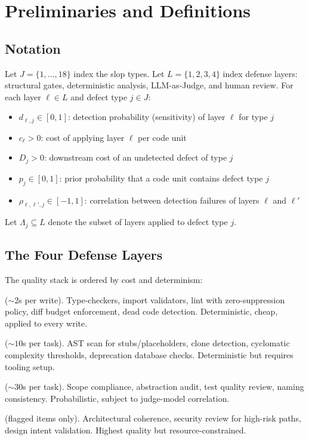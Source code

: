 \documentclass[11pt, a4paper]{article}
\theoremstyle{definition}
\theoremstyle{remark}
\begin{document}
\section{Preliminaries and Definitions}
\label{sec:prelim}

\subsection{Notation}

Let $J = \{1, \ldots, 18\}$ index the slop types. Let $L = \{1, 2, 3, 4\}$ index defense layers: structural gates, deterministic analysis, LLM-as-Judge, and human review. For each layer $\ell \in L$ and defect type $j \in J$:

\begin{itemize}[leftmargin=2em]
\item $d_{\ell,j} \in [0,1]$: detection probability (sensitivity) of layer $\ell$ for type $j$
\item $c_\ell > 0$: cost of applying layer $\ell$ per code unit
\item $D_j > 0$: downstream cost of an undetected defect of type $j$
\item $p_j \in [0,1]$: prior probability that a code unit contains defect type $j$
\item $\rho_{\ell,\ell',j} \in [-1,1]$: correlation between detection failures of layers $\ell$ and $\ell'$
\end{itemize}

Let $\Lambda_j \subseteq L$ denote the subset of layers applied to defect type $j$.

\subsection{The Four Defense Layers}

The quality stack is ordered by cost and determinism:

\begin{description}[leftmargin=2em]
\item[Layer 1: Structural gates] (${\sim}2$s per write). Type-checkers, import validators, lint with zero-suppression policy, diff budget enforcement, dead code detection. Deterministic, cheap, applied to every write.

\item[Layer 2: Deterministic analysis] (${\sim}10$s per task). AST scan for stubs/placeholders, clone detection, cyclomatic complexity thresholds, deprecation database checks. Deterministic but requires tooling setup.

\item[Layer 3: LLM-as-Judge] (${\sim}30$s per task). Scope compliance, abstraction audit, test quality review, naming consistency. Probabilistic, subject to judge-model correlation.

\item[Layer 4: Human review] (flagged items only). Architectural coherence, security review for high-risk paths, design intent validation. Highest quality but resource-constrained.
\end{description}
\end{document}
